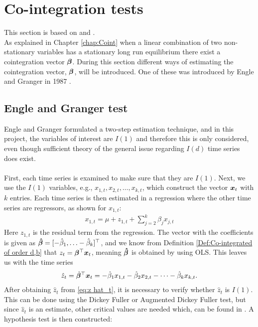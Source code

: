 \chapter{Co-integration tests}\label{chap:coint tests}
This section is based on \cite{Analysis_of_integrated_and_cointegrated_time_series_with_R} and \cite{Engle_grang_test}.\\
\noindent As explained in Chapter \ref{chap:Coint} when a linear combination of two non-stationary variables has a stationary long run equilibrium there exist a cointegration vector $\boldsymbol{\beta}$. During this section different ways of estimating the cointegration vector, $\boldsymbol{\beta}$, will be introduced. One of these was introduced by Engle and Granger in 1987 \cite{co-Integration_and_error_correction}.
\section{Engle and Granger test}
Engle and Granger formulated a two-step estimation technique, and in this project, the variables of interest are $I(1)$ and therefore this is only considered, even though sufficient theory of the general issue regarding $I(d)$ time series does exist. \\\\ 
First, each time series is examined to make sure that they are $I(1)$. Next, we use the $I(1)$ variables, e.g., $x_{1,t},x_{2,t},\ldots,x_{k,t}$, which construct the vector $\boldsymbol{x}_t$ with $k$ entries. Each time series is then estimated in a regression where the other time series are regressors, as shown for $x_{1,t}$:
\begin{align*}
    x_{1,t}=\mu+z_{1,t}+\sum^k_{j=2}\beta_j x_{j,t}
\end{align*}
Here $z_{1,t}$ is the residual term from the regression. The vector with the coefficients is given as $\boldsymbol{\hat{\beta}}=[-\hat{\beta}_1,\ldots-\hat{\beta}_k]^\top$, and we know from Definition \ref{Def:Co-integrated of order d,b} that $z_t=\boldsymbol{\beta}^\top \boldsymbol{x}_t$, meaning $\boldsymbol{\hat{\beta}}$ is obtained by using OLS. This leaves us with the time series
\begin{align}\label{eq:z hat_t}
\hat{z}_t=\hat{\boldsymbol{\beta}}^\top \boldsymbol{x}_t=-\hat{\beta}_{1}x_{1,t}-\hat{\beta}_{2}x_{2,t}-\cdots-\hat{\beta}_{k}x_{k,t}.
\end{align}
After obtaining $\hat{z}_t$ from \eqref{eq:z hat_t}, it is necessary to verify whether $\hat{z}_t$ is $I(1)$. This can be done using the Dickey Fuller or Augmented Dickey Fuller test, but since $\hat{z}_t$ is an estimate, other critical values are needed which, can be found in \cite{ENGLE1987143}. A hypothesis test is then constructed:
